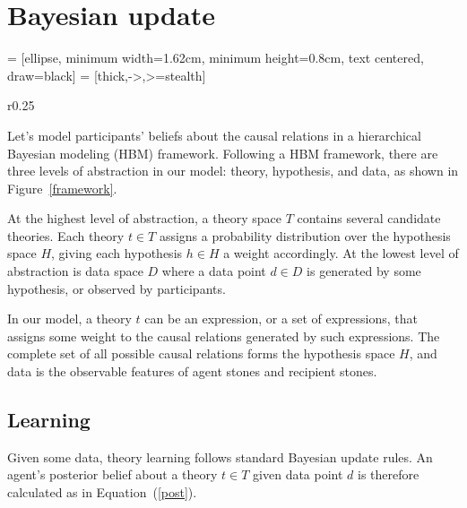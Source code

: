 \documentclass{article}
\begin{document}
\section{Bayesian update}

 = [ellipse, minimum width=1.62cm, minimum height=0.8cm, text centered, draw=black]
 = [thick,->,>=stealth]
\begin{wrapfigure}{r}{0.25\textwidth}
\begin{center}
	\caption{HBM}
	\label{framework}
\end{center}
\end{wrapfigure}


Let's model participants' beliefs about the causal relations in a hierarchical Bayesian modeling (HBM) framework. Following a HBM framework, there are three levels of abstraction in our model: theory, hypothesis, and data, as shown in Figure~\ref{framework}.

At the highest level of abstraction, a theory space $T$ contains several candidate theories. Each theory $t \in T$ assigns a probability distribution over the hypothesis space $H$, giving each hypothesis $h \in H$ a weight accordingly. At the lowest level of abstraction is data space $D$ where a data point $d \in D$ is generated by some hypothesis, or observed by participants.

In our model, a theory $t$ can be an expression, or a set of expressions, that assigns some weight to the causal relations generated by such expressions. The complete set of all possible causal relations forms the hypothesis space $H$, and data is the observable features of agent stones and recipient stones.

\subsection*{Learning}

Given some data, theory learning follows standard Bayesian update rules. An agent's posterior belief about a theory $t \in T$ given data point $d$ is therefore calculated as in Equation~(\ref{post}).
	
\end{document}
